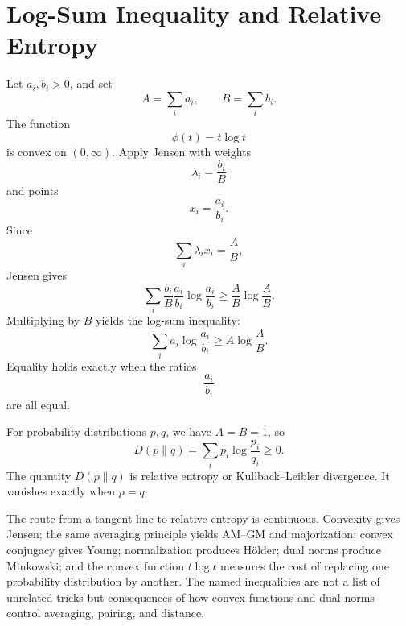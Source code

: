 \section{Log-Sum Inequality and Relative Entropy}

Let \(a_i,b_i>0\), and set
\[
  A=\sum_i a_i,
  \qquad
  B=\sum_i b_i.
\]
The function
\[
  \phi(t)=t\log t
\]
is convex on \((0,\infty)\).  Apply Jensen with weights
\[
  \lambda_i=\frac{b_i}{B}
\]
and points
\[
  x_i=\frac{a_i}{b_i}.
\]
Since
\[
  \sum_i\lambda_i x_i=\frac AB,
\]
Jensen gives
\[
  \sum_i\frac{b_i}{B}
  \frac{a_i}{b_i}
  \log\frac{a_i}{b_i}
  \ge
  \frac AB\log\frac AB.
\]
Multiplying by \(B\) yields the log-sum inequality:
\[
  \boxed{
  \sum_i a_i\log\frac{a_i}{b_i}
  \ge
  A\log\frac AB.}
\]
Equality holds exactly when the ratios
\[
  \frac{a_i}{b_i}
\]
are all equal.

For probability distributions \(p,q\), we have \(A=B=1\), so
\[
  D(p\|q)
  =\sum_i p_i\log\frac{p_i}{q_i}
  \ge0.
\]
The quantity \(D(p\|q)\) is relative entropy or Kullback--Leibler divergence.  It vanishes exactly when \(p=q\).

The route from a tangent line to relative entropy is continuous.  Convexity gives Jensen; the same averaging principle yields AM--GM and majorization; convex conjugacy gives Young; normalization produces Hölder; dual norms produce Minkowski; and the convex function \(t\log t\) measures the cost of replacing one probability distribution by another.  The named inequalities are not a list of unrelated tricks but consequences of how convex functions and dual norms control averaging, pairing, and distance.
